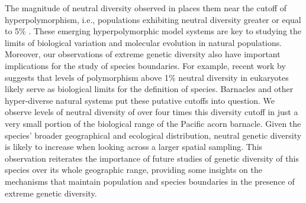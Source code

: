 The magnitude of neutral diversity  observed in \bgla{} places
them near the cutoff of hyperpolymorphism, i.e., populations exhibiting neutral diversity
greater or equal to 5\% \citep{cutter_molecular_2013}.
These emerging hyperpolymorphic model systems are key to studying the limits of biological
variation and molecular evolution in natural populations.
Moreover, our observations of extreme genetic diversity also have important implications
for the study of species boundaries.
For example, recent work by~\citet{hart_genomic_2025} suggests that levels
of polymorphism above 1\% neutral diversity in eukaryotes likely serve as biological limits
for the definition of species.
Barnacles and other hyper-diverse natural systems put these putative cutoffs into question.
We observe levels of neutral diversity of over four times this diversity cutoff in
just a very small portion of the biological range of the Pacific acorn barnacle.
Given the species' broader geographical and ecological distribution, neutral genetic
diversity is likely to increase when looking across a larger spatial sampling.
This observation reiterates the importance of future studies of genetic diversity
of this species over its whole geographic range, providing some insights on
the mechanisms that maintain population and species boundaries in the presence
of extreme genetic diversity.
\vspace{0.1cm}

